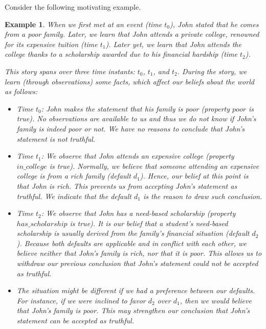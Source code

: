 \documentclass{article}
\newtheorem{example}{Example}%
\begin{document}
Consider the following motivating example.
\begin{example} \label{ex1}
When we first met at an event (time $t_0$), John stated that he comes from a poor family. 
Later, we  learn that John attends a private college, renowned for  its expensive tuition (time $t_1$). Later yet, we learn 
that John attends the college thanks to a  scholarship awarded  due to his financial hardship (time $t_2$).

This story spans over three time instants: $t_0$, $t_1$, and $t_2$. During the story, we learn (through observations) some facts, which  affect our beliefs about the world as follows:    

\begin{itemize}

\item Time $t_0$: John makes the statement that his family is poor (property $poor$ is true). No observations are available to us and thus we do not know if John's family is indeed poor or not. We have no reasons to conclude that John's statement is not truthful. 

\item Time $t_1$:  We observe that John attends an expensive college (property $in\_college$ is true). {\emph{Normally}, we believe that someone attending an expensive college is from a rich family} (default $d_1$). Hence, our belief at this point is that John is rich. This prevents us from accepting John's statement as truthful. We indicate that  the default $d_1$ is the reason to draw such conclusion. 

\item Time $t_2$: We observe that John has a need-based scholarship   (property $has\_scholarship$ is true). {It is our belief that a student's need-based scholarship is \emph{usually} derived from the family's financial situation} (default $d_2$). Because both defaults are applicable and in conflict with each other, we believe neither that John's family is rich, nor that it is poor. This allows us to withdraw our previous conclusion that John's statement could not be accepted as truthful.  

\item The situation might be different if we had a preference between our defaults. For instance, if we were inclined to favor $d_2$ over $d_1$, then we would believe that John's family is poor. This may strengthen our conclusion that John's statement can be accepted as truthful. 
% 
\end{itemize}  
\end{example}  
\end{document}
